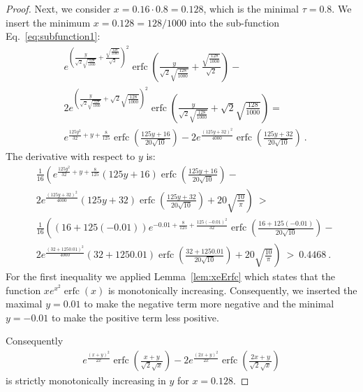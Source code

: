\documentclass{article}
\DeclareMathOperator{\erfc}{erfc}
\begin{document}
\begin{proof}
Next, we consider $x=0.16 \cdot 0.8=0.128$, which is the minimal $\tau=0.8$.
We insert the minimum $x=0.128=128/1000$ into the  sub-function
Eq.~\eqref{eq:subfunction1}:
\begin{align}
&e^{\left(\frac{y}{\sqrt{2} \sqrt{\frac{128}{1000}}}+\frac{\sqrt{\frac{128}{1000}}}{\sqrt{2}}\right)^2} \erfc \left(\frac{y}{\sqrt{2} \sqrt{\frac{128}{1000}}}+\frac{\sqrt{\frac{128}{1000}}}{\sqrt{2}}\right)-\\ \nonumber &2 e^{\left(\frac{y}{\sqrt{2} \sqrt{\frac{128}{1000}}}+\sqrt{2} \sqrt{\frac{128}{1000}}\right)^2} \erfc \left(\frac{y}{\sqrt{2} \sqrt{\frac{128}{1000}}}+\sqrt{2} \sqrt{\frac{128}{1000}}\right)=\\ \nonumber &e^{\frac{125 y^2}{32}+y+\frac{8}{125}} \erfc \left(\frac{125 y+16}{20 \sqrt{10}}\right)-2 e^{\frac{(125 y+32)^2}{4000}} \erfc \left(\frac{125 y+32}{20 \sqrt{10}}\right)\ .
\end{align}
The derivative with respect to $y$ is:
\begin{align}
&\frac{1}{16} \left(e^{\frac{125 y^2}{32}+y+\frac{8}{125}} (125 y+16) \erfc \left(\frac{125 y+16}{20 \sqrt{10}}\right)-\right. \\ \nonumber &\left.2 e^{\frac{(125 y+32)^2}{4000}} (125 y+32) \erfc \left(\frac{125 y+32}{20 \sqrt{10}}\right)+20 \sqrt{\frac{10}{\pi }}\right)\ > \ \\ \nonumber &\frac{1}{16} \left((16+125 (-0.01)) e^{-0.01 +\frac{8}{125}+\frac{125 (-0.01)^2}{32}} \erfc \left(\frac{16+125 (-0.01)}{20 \sqrt{10}}\right)-\right. \\ \nonumber &\left.2 e^{\frac{(32+125 0.01)^2}{4000}} (32+125 0.01) \erfc \left(\frac{32+125 0.01}{20 \sqrt{10}}\right)+20 \sqrt{\frac{10}{\pi }}\right)\ > \ 0.4468 \ .
\end{align}
For the first inequality we applied Lemma~\ref{lem:xeErfc}
which states that the function $x e^{x^2} \erfc (x)$ is
monotonically increasing.
Consequently, we inserted the maximal $y=0.01$ to
make the negative term more negative and the minimal $y=-0.01$
to make the positive term less positive.

Consequently 
\begin{align}
e^{\frac{(x+y)^2}{2 x}} \erfc \left(\frac{x+y}{\sqrt{2} \sqrt{x}}\right)-2 e^{\frac{(2 x+y)^2}{2 x}} \erfc \left(\frac{2 x+y}{\sqrt{2} \sqrt{x}}\right)
\end{align}
is strictly monotonically increasing in $y$ for $x=0.128$. 



\end{proof}
\end{document}
